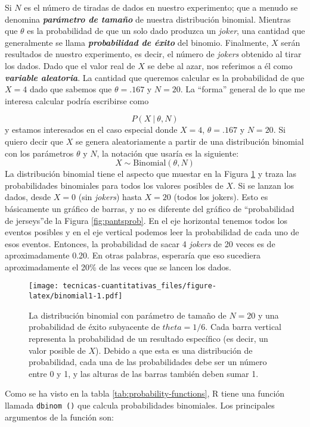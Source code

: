 \documentclass[
]{book}
\begin{document}
Si \(N\) es el número de tiradas de dados en nuestro experimento; que a menudo se denomina \textbf{\emph{parámetro de tamaño}} de nuestra distribución binomial. Mientras que \(\theta\) es la probabilidad de que un solo dado produzca un \emph{joker}, una cantidad que generalmente se llama \textbf{\emph{probabilidad de éxito}} del binomio. Finalmente, \(X\) serán resultados de nuestro experimento, es decir, el número de \emph{jokers} obtenido al tirar los dados. Dado que el valor real de \(X\) se debe al azar, nos referimos a él como \textbf{\emph{variable aleatoria}}. La cantidad que queremos calcular es la probabilidad de que \(X=4\) dado que sabemos que \(\theta=.167\) y \(N=20\). La ``forma'' general de lo que me interesa calcular podría escribirse como

\[
P(X \ | \ \theta, N)
\]
y estamos interesados en el caso especial donde \(X=4\), \(\theta=.167\) y \(N=20\). Si quiero decir que \(X\) se genera aleatoriamente a partir de una distribución binomial con los parámetros \(\theta\) y \(N\), la notación que usaría es la siguiente:
\[
X \sim \mbox{Binomial}(\theta, N)
\]
La distribución binomial tiene el aspecto que muestar en la Figura \ref{fig:binomial1} y traza las probabilidades binomiales para todos los valores posibles de \(X\). Si se lanzan los dados, desde \(X=0\) (sin \emph{jokers}) hasta \(X=20\) (todos los jokers). Esto es básicamente un gráfico de barras, y no es diferente del gráfico de ``probabilidad de jerseys''de la Figura \ref{fig:pantsprob}. En el eje horizontal tenemos todos los eventos posibles y en el eje vertical podemos leer la probabilidad de cada uno de esos eventos. Entonces, la probabilidad de sacar 4 \emph{jokers} de 20 veces es de aproximadamente 0.20. En otras palabras, esperaría que eso sucediera aproximadamente el 20\% de las veces que se lancen los dados.

\begin{figure}
\centering
\texttt{[image: tecnicas-cuantitativas\_files/figure-latex/binomial1-1.pdf]}
\caption{\label{fig:binomial1}La distribución binomial con parámetro de tamaño de \(N=20\) y una probabilidad de éxito subyacente de \(theta=1/6\). Cada barra vertical representa la probabilidad de un resultado específico (es decir, un valor posible de \(X\)). Debido a que esta es una distribución de probabilidad, cada una de las probabilidades debe ser un número entre 0 y 1, y las alturas de las barras también deben sumar 1.}
\end{figure}

Como se ha visto en la tabla \ref{tab:probability-functions}, R tiene una función llamada \texttt{dbinom\ ()} que calcula probabilidades binomiales. Los principales argumentos de la función son:
\end{document}
